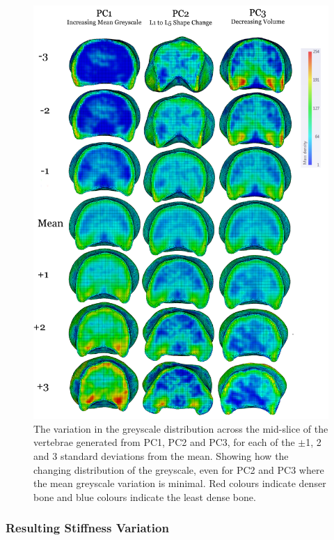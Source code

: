 \begin{figure}[p]
  \centering
  \includegraphics[width=.9\textwidth]{Chapters/Chapter_PCA_images/all_pc1_2_3_slice_gs_density.png}
	\caption[The variation in the greyscale distribution across the
	mid-slice of the vertebrae generated from the first three principal
	components.]{The variation in the greyscale distribution across the
	mid-slice of the vertebrae generated from PC1, PC2 and PC3, for each of
	the $\pm$1, 2 and 3 standard deviations from the mean.  Showing how the
	changing distribution of the greyscale, even for PC2 and PC3 where the
	mean greyscale variation is minimal.  Red colours indicate denser bone
	and blue colours indicate the least dense bone.}
  \label{fig:all_pc1_2_3_slice_gs_density}
\end{figure}

\subsubsection{Resulting Stiffness Variation}

